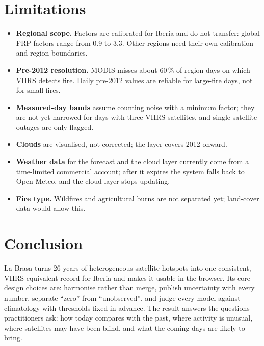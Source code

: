 \documentclass[11pt,a4paper]{article}
\begin{document}
\section{Limitations}

\begin{itemize}
  \item \textbf{Regional scope.} Factors are calibrated for Iberia and do not transfer: global FRP factors
        range from 0.9 to 3.3. Other regions need their own calibration and region boundaries.
  \item \textbf{Pre-2012 resolution.} MODIS misses about 60\,\% of region-days on which VIIRS detects fire.
        Daily pre-2012 values are reliable for large-fire days, not for small fires.
  \item \textbf{Measured-day bands} assume counting noise with a minimum factor; they are not yet narrowed
        for days with three VIIRS satellites, and single-satellite outages are only flagged.
  \item \textbf{Clouds} are visualised, not corrected; the layer covers 2012 onward.
  \item \textbf{Weather data} for the forecast and the cloud layer currently come from a time-limited
        commercial account; after it expires the system falls back to Open-Meteo, and the cloud layer stops
        updating.
  \item \textbf{Fire type.} Wildfires and agricultural burns are not separated yet; land-cover data would
        allow this.
\end{itemize}

\section{Conclusion}

La Brasa turns 26 years of heterogeneous satellite hotspots into one consistent, VIIRS-equivalent record
for Iberia and makes it usable in the browser. Its core design choices are: harmonise rather than merge,
publish uncertainty with every number, separate ``zero'' from ``unobserved'', and judge every model
against climatology with thresholds fixed in advance. The result answers the questions practitioners ask:
how today compares with the past, where activity is unusual, where satellites may have been blind, and
what the coming days are likely to bring.
\end{document}
